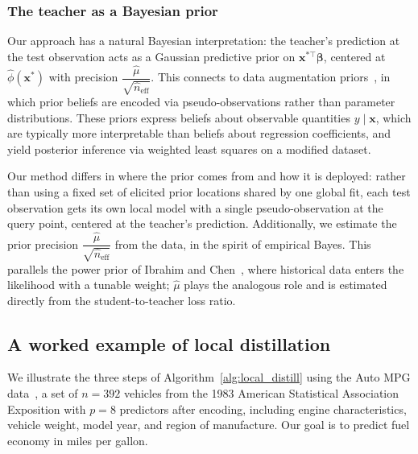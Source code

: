 \documentclass[12pt]{article}
\theoremstyle{definition}
\begin{document}
\subsubsection{The teacher as a Bayesian prior}

Our approach has a natural Bayesian interpretation: the teacher's prediction at the test observation acts as a Gaussian predictive prior on $\bm{x}^{*\top}\bm{\beta}$, centered at $\hat\phi(\bm{x}^*)$ with precision $\dfrac{\hat\mu}{\sqrt{\hat n_{\text{eff}}}}$. This connects to data augmentation priors~\cite{kadane1980interactive, bedrick1996new}, in which prior beliefs are encoded via pseudo-observations rather than parameter distributions. These priors express beliefs about observable quantities $y \mid \bm{x}$, which are typically more interpretable than beliefs about regression coefficients, and yield posterior inference via weighted least squares on a modified dataset.

Our method differs in where the prior comes from and how it is deployed: rather than using a fixed set of elicited prior locations shared by one global fit, each test observation gets its own local model with a single pseudo-observation at the query point, centered at the teacher's prediction. Additionally, we estimate the prior precision $\dfrac{\hat\mu}{\sqrt{\hat n_{\text{eff}}}}$ from the data, in the spirit of empirical Bayes.
This parallels the power prior of Ibrahim and Chen~\cite{ibrahim2000power}, where historical data enters the likelihood with a tunable weight; $\hat\mu$ plays the analogous role and is estimated directly from the student-to-teacher loss ratio.


\subsection{A worked example of local distillation}
\label{sec: example1}

We illustrate the three steps of Algorithm~\ref{alg:local_distill} using the Auto MPG data~\cite{autompg1993}, a set of $n = 392$ vehicles from the 1983 American Statistical Association Exposition with $p = 8$ predictors after encoding, including engine characteristics, vehicle weight, model year, and region of manufacture. Our goal is to predict fuel economy in miles per gallon.
\end{document}
